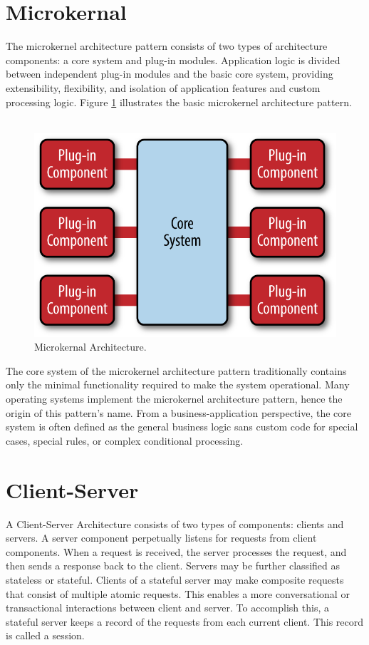 \documentclass{article}
\begin{document}
\section{Microkernal}
The microkernel architecture pattern consists of two types of architecture components: a core system and plug-in modules. Application logic is divided between independent plug-in modules and the basic core system, providing extensibility, flexibility, and isolation of application features and custom processing logic. Figure \ref{fig_mk} illustrates the basic microkernel architecture pattern.\\\\

\begin{figure}[h]
\centering
\includegraphics[scale=1.7]{mk.png}
\caption{Microkernal Architecture.}
\label{fig_mk}
\end{figure}

\noindent The core system of the microkernel architecture pattern traditionally contains only the minimal functionality required to make the system operational. Many operating systems implement the microkernel architecture pattern, hence the origin of this pattern's name. From a business-application perspective, the core system is often defined as the general business logic sans custom code for special cases, special rules, or complex conditional processing.
\newpage


\section{Client-Server}
A Client-Server Architecture consists of two types of components: clients and servers. A server component perpetually listens for requests from client components. When a request is received, the server processes the request, and then sends a response back to the client. Servers may be further classified as stateless or stateful. Clients of a stateful server may make composite requests that consist of multiple atomic requests. This enables a more conversational or transactional interactions between client and server. To accomplish this, a stateful server keeps a record of the requests from each current client. This record is called a session.\\\\
\end{document}
